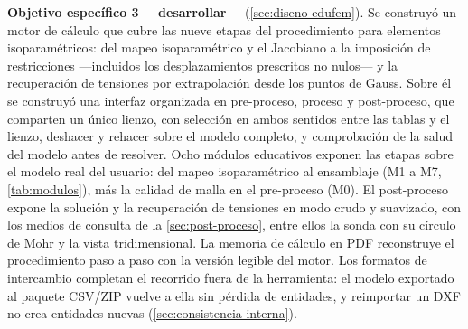 \textbf{Objetivo específico 3 —desarrollar—} (\autoref{sec:diseno-edufem}). Se construyó un motor de cálculo que cubre las nueve etapas del procedimiento para elementos isoparamétricos: del mapeo isoparamétrico y el Jacobiano a la imposición de restricciones —incluidos los desplazamientos prescritos no nulos— y la recuperación de tensiones por extrapolación desde los puntos de Gauss. Sobre él se construyó una interfaz organizada en pre-proceso, proceso y post-proceso, que comparten un único lienzo, con selección en ambos sentidos entre las tablas y el lienzo, deshacer y rehacer sobre el modelo completo, y comprobación de la salud del modelo antes de resolver. Ocho módulos educativos exponen las etapas sobre el modelo real del usuario: del mapeo isoparamétrico al ensamblaje (M1 a M7, \autoref{tab:modulos}), más la calidad de malla en el pre-proceso (M0). El post-proceso expone la solución y la recuperación de tensiones en modo crudo y suavizado, con los medios de consulta de la \autoref{sec:post-proceso}, entre ellos la sonda con su círculo de Mohr y la vista tridimensional. La memoria de cálculo en PDF reconstruye el procedimiento paso a paso con la versión legible del motor. Los formatos de intercambio completan el recorrido fuera de la herramienta: el modelo exportado al paquete CSV/ZIP vuelve a ella sin pérdida de entidades, y reimportar un DXF no crea entidades nuevas (\autoref{sec:consistencia-interna}).

